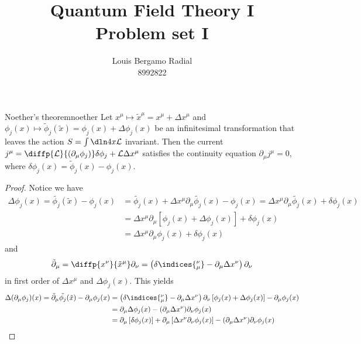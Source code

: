 \documentclass[english]{artigo}
\author{Louis Bergamo Radial\\8992822}
\title{Quantum Field Theory I\\Problem set I}
\begin{document}
   \maketitle
   \begin{theorem}{Noether's theorem}{noether}
      Let \(x^\mu \mapsto \tilde{x}^\mu = x^\mu + \Delta x^\mu\) and \(\phi_j(x) \mapsto \tilde{\phi}_j(\tilde{x}) = \phi_j(x) + \Delta\phi_j(x)\) be an infinitesimal transformation that leaves the action \(S = \int \dln4x \mathcal{L}\) invariant. Then the current \(j^\mu = \diffp{\mathcal{L}}{(\partial_\mu \phi_j)} \delta \phi_j + \mathcal{L} \Delta x^\mu\) satisfies the continuity equation \(\partial_\mu j^\mu = 0\), where \(\delta \phi_j(x) = \tilde{\phi}_j(x) - \phi_j(x)\).
   \end{theorem}
   \begin{proof}
      Notice we have
      \begin{align*}
         \Delta\phi_j(x) = \tilde{\phi_j}(\tilde{x}) - \phi_j(x) &= \tilde{\phi_j}(x) + \Delta x^\mu \partial_\mu \tilde{\phi_j}(x) - \phi_j(x) = \Delta x^\mu \partial_\mu \tilde{\phi_j}(x) + \delta \phi_j(x)\\
                                                                 &= \Delta x^\mu \partial_\mu \left[\phi_j(x) + \Delta \phi_j(x)\right] + \delta\phi_j(x)\\
                                                                 &= \Delta x^\mu \partial_\mu \phi_j(x) + \delta\phi_j(x)
      \end{align*}
      and
      \begin{equation*}
         \tilde{\partial}_\mu = \diffp{x^\nu}{\tilde{x}^\mu} \partial_\nu = \left(\delta\indices{^\nu_\mu} - \partial_\mu \Delta x^\nu\right)\partial_\nu
      \end{equation*}
      in first order of \(\Delta x^\mu\) and \(\Delta \phi_j(x)\). This yields
      \begin{align*}
         \Delta (\partial_\mu \phi_j)(x) = \tilde{\partial}_\mu \tilde{\phi_j}(\tilde{x}) - \partial_\mu \phi_j(x) 
         &= \left(\delta\indices{^\nu_\mu} - \partial_\mu \Delta x^\nu\right) \partial_\nu \left[\phi_j(x) + \Delta \phi_j(x)\right] - \partial_\mu \phi_j(x)\\
         &= \partial_\mu \Delta\phi_j(x) - (\partial_\mu \Delta x^\nu) \partial_\nu \phi_j(x)\\
         &= \partial_\mu \left[\delta \phi_j(x)\right] + \partial_\mu \left[\Delta x^\nu \partial_\nu \phi_j(x)\right] - (\partial_\mu \Delta x^\nu) \partial_\nu \phi_j(x)\\

\end{align*}
\end{proof}
\end{document}
